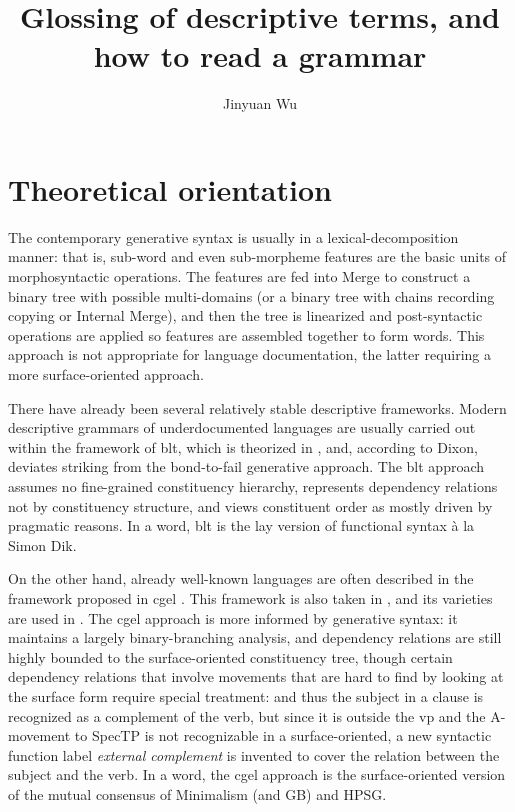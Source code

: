 \documentclass{article}
\title{Glossing of descriptive terms, and how to read a grammar}
\author{Jinyuan Wu}
\newcommand*{\term}[1]{\emph{#1}}
\newcommand{\ala}{à la}
\begin{document}
\maketitle

\section{Theoretical orientation}\label{sec:theory}

The contemporary generative syntax is usually in a lexical-decomposition manner:
that is, sub-word and even sub-morpheme features are the basic units of morphosyntactic operations.
The features are fed into Merge to construct a binary tree with possible multi-domains
(or a binary tree with chains recording copying or Internal Merge),
and then the tree is linearized and post-syntactic operations are applied 
so features are assembled together to form words.
This approach is not appropriate for language documentation,
the latter requiring a more surface-oriented approach.

There have already been several relatively stable descriptive frameworks.
Modern descriptive grammars of underdocumented languages 
are usually carried out within the framework of \ac{blt},
which is theorized in \citet{dixon2009basic1,dixon2010basic2,dixon2012basic3},
and, according to Dixon, deviates striking from the bond-to-fail generative approach.
The \ac{blt} approach assumes no fine-grained constituency hierarchy,
represents dependency relations not by constituency structure,
and views constituent order as mostly driven by pragmatic reasons.
In a word, \ac{blt} is the lay version of functional syntax \ala{} Simon Dik.

On the other hand, already well-known languages are often described in the framework proposed in 
\ac{cgel} \citep{cgel}.
This framework is also taken in \citet{abeille2021grande},
and its varieties are used in \citet{demonte1999gramatica1,munoz2000gramatica2,bosque1999gramatica3}.
The \ac{cgel} approach is more informed by generative syntax:
it maintains a largely binary-branching analysis,
and dependency relations are still highly bounded to the surface-oriented constituency tree,
though certain dependency relations that involve movements that are hard to find by looking at the surface form 
require special treatment:
and thus the subject in a clause is recognized as a complement of the verb,
but since it is outside the \ac{vp} and the A-movement to SpecTP is not recognizable
in a surface-oriented,
a new syntactic function label \term{external complement} 
is invented to cover the relation between the subject and the verb.
In a word, the \ac{cgel} approach
is the surface-oriented version of the mutual consensus of Minimalism (and GB) and HPSG.
\end{document}

